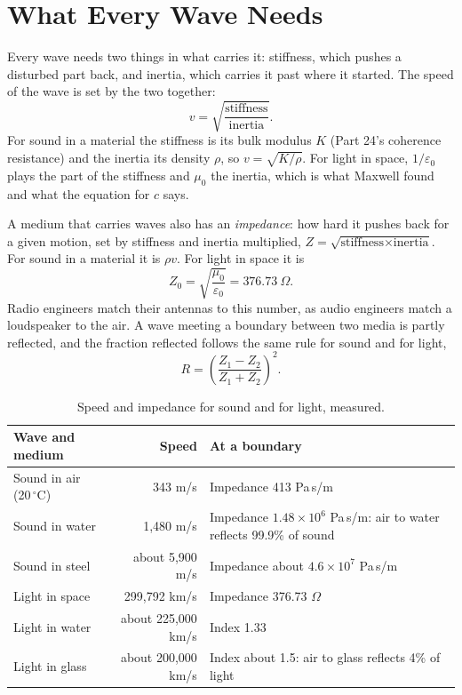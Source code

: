 \documentclass[11pt,a4paper]{article}
\begin{document}
\section{What Every Wave Needs}

Every wave needs two things in what carries it: stiffness, which pushes a disturbed part back, and inertia, which carries it past where it started. The speed of the wave is set by the two together:
\begin{equation}
v = \sqrt{\frac{\text{stiffness}}{\text{inertia}}}.
\end{equation}
For sound in a material the stiffness is its bulk modulus $K$ (Part 24's coherence resistance) and the inertia its density $\rho$, so $v = \sqrt{K/\rho}$. For light in space, $1/\varepsilon_0$ plays the part of the stiffness and $\mu_0$ the inertia, which is what Maxwell found and what the equation for $c$ says.

A medium that carries waves also has an \emph{impedance}: how hard it pushes back for a given motion, set by stiffness and inertia multiplied, $Z = \sqrt{\text{stiffness}\times\text{inertia}}$. For sound in a material it is $\rho v$. For light in space it is
\begin{equation}
Z_0 = \sqrt{\frac{\mu_0}{\varepsilon_0}} = 376.73~\Omega.
\end{equation}
Radio engineers match their antennas to this number, as audio engineers match a loudspeaker to the air. A wave meeting a boundary between two media is partly reflected, and the fraction reflected follows the same rule for sound and for light,
\begin{equation}
R = \left(\frac{Z_1 - Z_2}{Z_1 + Z_2}\right)^2 .
\end{equation}

\begin{table}[h]\centering\small
\caption{Speed and impedance for sound and for light, measured.}
\begin{tabularx}{\linewidth}{@{}l r X@{}}\toprule
\textbf{Wave and medium} & \textbf{Speed} & \textbf{At a boundary}\\\midrule
Sound in air (20\,$^\circ$C) & 343 m/s & Impedance 413 Pa\,s/m\\
Sound in water & 1,480 m/s & Impedance $1.48\times10^6$ Pa\,s/m: air to water reflects 99.9\% of sound\\
Sound in steel & about 5,900 m/s & Impedance about $4.6\times10^7$ Pa\,s/m\\
Light in space & 299,792 km/s & Impedance 376.73 $\Omega$\\
Light in water & about 225,000 km/s & Index 1.33\\
Light in glass & about 200,000 km/s & Index about 1.5: air to glass reflects 4\% of light\\\bottomrule
\end{tabularx}\label{tab:waves}\end{table}
\end{document}
